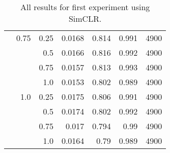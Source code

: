 \begin{table}[H]
{\begin{tabular}{rrrrrrr}
              & 0.75          & 0.25          & 0.0168               & 0.814                   & 0.991                   & 4900          \\
              &               & 0.5           & 0.0166               & 0.816                   & 0.992                   & 4900          \\
              &               & 0.75          & 0.0157               & 0.813                   & 0.993                   & 4900          \\
              &               & 1.0           & 0.0153               & 0.802                   & 0.989                   & 4900          \\
              & 1.0           & 0.25          & 0.0175               & 0.806                   & 0.991                   & 4900          \\
              &               & 0.5           & 0.0174               & 0.802                   & 0.992                   & 4900          \\
              &               & 0.75          & 0.017                & 0.794                   & 0.99                    & 4900          \\
              &               & 1.0           & 0.0164               & 0.79                    & 0.989                   & 4900         
\end{tabular}
}

\caption{All results for first experiment using SimCLR.}
\end{table}
